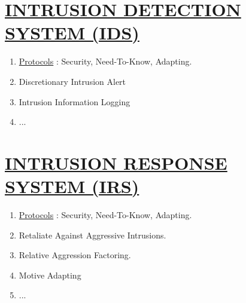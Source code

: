 \documentclass[11pt]{article}
\begin{document}
\section*{\ul{INTRUSION DETECTION SYSTEM (IDS)}}
\begin{enumerate}
	\item[] \ul{Protocols} : Security, Need-To-Know, Adapting.
	
	\item[] Discretionary Intrusion Alert
	\item[] Intrusion Information Logging
	\item[] ...
	
\end{enumerate}


\section*{\ul{INTRUSION RESPONSE SYSTEM (IRS)}}
\begin{enumerate}
	\item[] \ul{Protocols} : Security, Need-To-Know, Adapting.
	
	\item[] Retaliate Against Aggressive Intrusions.
	\item[] Relative Aggression Factoring.
	\item[] Motive Adapting
	\item[] ...
	
\end{enumerate}
\end{document}
